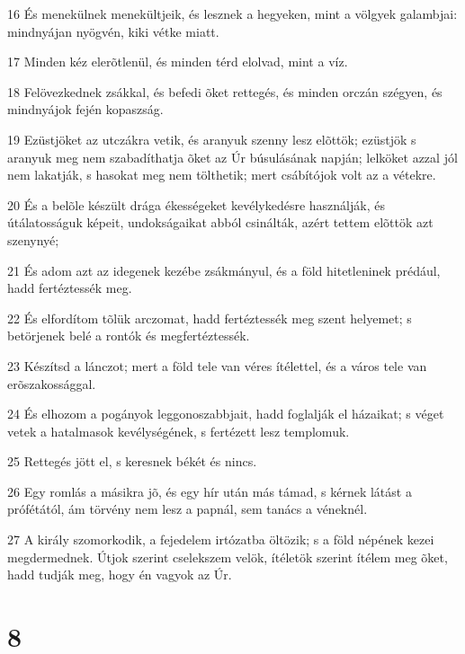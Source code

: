 \par 16 És menekülnek menekültjeik, és lesznek a hegyeken, mint a völgyek galambjai: mindnyájan nyögvén, kiki vétke miatt.
\par 17 Minden kéz elerõtlenül, és minden térd elolvad, mint a víz.
\par 18 Felövezkednek zsákkal, és befedi õket rettegés, és minden orczán szégyen, és mindnyájok fején kopaszság.
\par 19 Ezüstjöket az utczákra vetik, és aranyuk szenny lesz elõttök; ezüstjök s aranyuk meg nem szabadíthatja õket az Úr búsulásának napján; lelköket azzal jól nem lakatják, s hasokat meg nem tölthetik; mert csábítójok volt az a vétekre.
\par 20 És a belõle készült drága ékességeket kevélykedésre használják, és útálatosságuk képeit, undokságaikat abból csinálták, azért tettem elõttök azt szenynyé;
\par 21 És adom azt az idegenek kezébe zsákmányul, és a föld hitetleninek prédául, hadd fertéztessék meg.
\par 22 És elfordítom tõlük arczomat, hadd fertéztessék meg szent helyemet; s betörjenek belé a rontók és megfertéztessék.
\par 23 Készítsd a lánczot; mert a föld tele van véres ítélettel,  és a város tele van erõszakossággal.
\par 24 És elhozom a pogányok leggonoszabbjait, hadd foglalják el házaikat; s véget vetek a hatalmasok kevélységének, s fertézett lesz templomuk.
\par 25 Rettegés jött el, s keresnek békét és nincs.
\par 26 Egy romlás a másikra jõ, és egy hír után más támad, s kérnek látást a prófétától, ám törvény nem lesz a papnál, sem tanács a véneknél.
\par 27 A király szomorkodik, a fejedelem irtózatba öltözik; s a föld népének kezei megdermednek. Útjok szerint cselekszem velök, ítéletök szerint ítélem meg õket, hadd tudják meg, hogy én vagyok az Úr.

\chapter{8}

